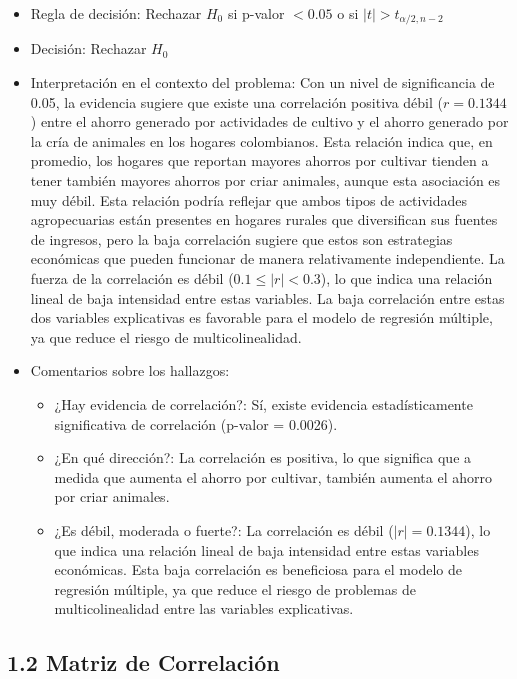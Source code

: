 \documentclass[12pt,a4paper]{article}
\begin{document}
\begin{itemize}
    \item Regla de decisión: Rechazar $H_0$ si p-valor $< 0.05$ o si $|t| > t_{\alpha/2, n-2}$
    \item Decisión: Rechazar $H_0$
    \item Interpretación en el contexto del problema: Con un nivel de significancia de 0.05, la evidencia sugiere que existe una correlación positiva débil ($r = 0.1344$) entre el ahorro generado por actividades de cultivo y el ahorro generado por la cría de animales en los hogares colombianos. Esta relación indica que, en promedio, los hogares que reportan mayores ahorros por cultivar tienden a tener también mayores ahorros por criar animales, aunque esta asociación es muy débil. Esta relación podría reflejar que ambos tipos de actividades agropecuarias están presentes en hogares rurales que diversifican sus fuentes de ingresos, pero la baja correlación sugiere que estos son estrategias económicas que pueden funcionar de manera relativamente independiente. La fuerza de la correlación es débil ($0.1 \leq |r| < 0.3$), lo que indica una relación lineal de baja intensidad entre estas variables. La baja correlación entre estas dos variables explicativas es favorable para el modelo de regresión múltiple, ya que reduce el riesgo de multicolinealidad.
    \item Comentarios sobre los hallazgos:
    \begin{itemize}
        \item ¿Hay evidencia de correlación?: Sí, existe evidencia estadísticamente significativa de correlación (p-valor = 0.0026).
        \item ¿En qué dirección?: La correlación es positiva, lo que significa que a medida que aumenta el ahorro por cultivar, también aumenta el ahorro por criar animales.
        \item ¿Es débil, moderada o fuerte?: La correlación es débil ($|r| = 0.1344$), lo que indica una relación lineal de baja intensidad entre estas variables económicas. Esta baja correlación es beneficiosa para el modelo de regresión múltiple, ya que reduce el riesgo de problemas de multicolinealidad entre las variables explicativas.
    \end{itemize}
\end{itemize}

\subsection*{1.2 Matriz de Correlación}
\end{document}
